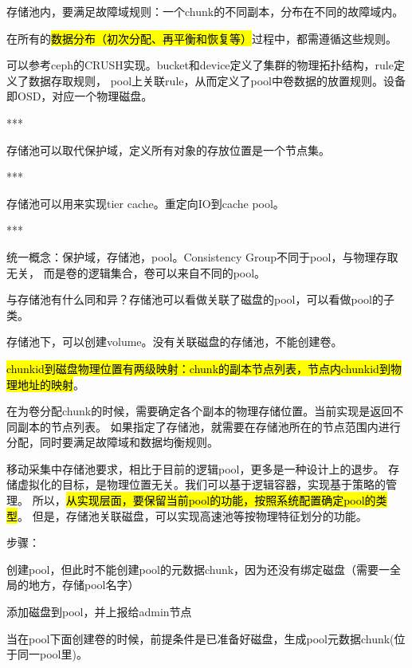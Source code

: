 存储池内，要满足故障域规则：一个chunk的不同副本，分布在不同的故障域内。\label{rule:faultset}

在所有的\hl{数据分布（初次分配、再平衡和恢复等）}过程中，都需遵循这些规则。

\begin{tcolorbox}

可以参考ceph的CRUSH实现。bucket和device定义了集群的物理拓扑结构，rule定义了数据存取规则，
pool上关联rule，从而定义了pool中卷数据的放置规则。设备即OSD，对应一个物理磁盘。

***

存储池可以取代保护域，定义所有对象的存放位置是一个节点集。

***

存储池可以用来实现tier cache。重定向IO到cache pool。

***

统一概念：保护域，存储池，pool。Consistency Group不同于pool，与物理存取无关，
而是卷的逻辑集合，卷可以来自不同的pool。

\end{tcolorbox}

与存储池有什么同和异？存储池可以看做关联了磁盘的pool，可以看做pool的子类。


存储池下，可以创建volume。没有关联磁盘的存储池，不能创建卷。

\hl{chunkid到磁盘物理位置有两级映射：chunk的副本节点列表，节点内chunkid到物理地址的映射}。

在为卷分配chunk的时候，需要确定各个副本的物理存储位置。当前实现是返回不同副本的节点列表。
如果指定了存储池，就需要在存储池所在的节点范围内进行分配，同时要满足故障域和数据均衡规则。

\begin{tcolorbox}
移动采集中存储池要求，相比于目前的逻辑pool，更多是一种设计上的退步。
存储虚拟化的目标，是物理位置无关。我们可以基于逻辑容器，实现基于策略的管理。
所以，\hl{从实现层面，要保留当前pool的功能，按照系统配置确定pool的类型}。
但是，存储池关联磁盘，可以实现高速池等按物理特征划分的功能。
\end{tcolorbox}


步骤：
\begin{enumbox}
\item 创建pool，但此时不能创建pool的元数据chunk，因为还没有绑定磁盘（需要一全局的地方，存储pool名字）
\item 添加磁盘到pool，并上报给admin节点
\item 当在pool下面创建卷的时候，前提条件是已准备好磁盘，生成pool元数据chunk(位于同一pool里)。
\end{enumbox}

